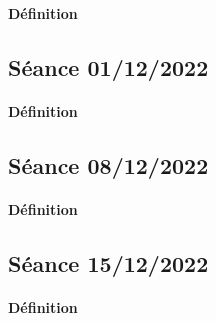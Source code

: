 \documentclass{article}
\begin{document}
\paragraph{Définition}

\subsection{Séance 01/12/2022}
\paragraph{Définition}

\subsection{Séance 08/12/2022}
\paragraph{Définition}

\subsection{Séance 15/12/2022}
\paragraph{Définition}
\end{document}
